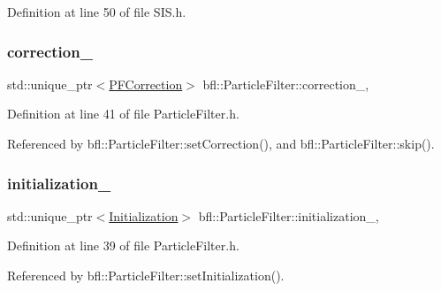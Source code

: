 Definition at line 50 of file S\+I\+S.\+h.

\mbox{\label{classbfl_1_1ParticleFilter_a691428357c812ba009e995175778c173}} 
\subsubsection{\texorpdfstring{correction\+\_\+}{correction\_}}
{\footnotesize\ttfamily std\+::unique\+\_\+ptr$<$\mbox{\hyperlink{classbfl_1_1PFCorrection}{P\+F\+Correction}}$>$ bfl\+::\+Particle\+Filter\+::correction\+\_\+\hspace{0.3cm}{\ttfamily [protected]}, {\ttfamily [inherited]}}



Definition at line 41 of file Particle\+Filter.\+h.



Referenced by bfl\+::\+Particle\+Filter\+::set\+Correction(), and bfl\+::\+Particle\+Filter\+::skip().

\mbox{\label{classbfl_1_1ParticleFilter_a5aff690b4287811912a62548188a0dda}} 
\subsubsection{\texorpdfstring{initialization\+\_\+}{initialization\_}}
{\footnotesize\ttfamily std\+::unique\+\_\+ptr$<$\mbox{\hyperlink{classbfl_1_1Initialization}{Initialization}}$>$ bfl\+::\+Particle\+Filter\+::initialization\+\_\+\hspace{0.3cm}{\ttfamily [protected]}, {\ttfamily [inherited]}}



Definition at line 39 of file Particle\+Filter.\+h.



Referenced by bfl\+::\+Particle\+Filter\+::set\+Initialization().

\mbox{\label{classbfl_1_1SIS_aed940f18871c4b12b70bf720bc671184}} 
